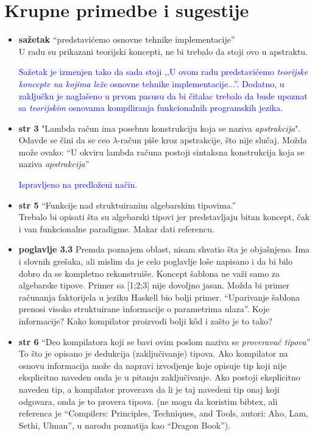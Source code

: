 \documentclass[a4paper]{report}
\newcommand{\odgovor}[1]{\textcolor{blue}{#1}}
\begin{document}
\section{Krupne primedbe i sugestije}
\begin{itemize}
\item \textbf{sažetak} ``predstavićemo osnovne tehnike implementacije'' \\ U radu su prikazani teorijski koncepti, ne bi trebalo da stoji ovo u apstraktu.

\odgovor{Sažetak je izmenjen tako da sada stoji ‚‚U ovom radu predstavićemo \textit{teorijske koncepte na kojima leže} osnovne tehnike implementacije...''. Dodatno, u zaključku je naglašeno u prvom pasusu da bi čitalac trebalo da bude upoznat sa \textit{teorijskim} osnovama kompiliranja funkcionalnih programskih jezika.}

\item \textbf{str 3} "Lambda račun ima posebnu konstrukciju koja se naziva \textit{apstrakcija}".\\Odavde se čini da se ceo $\lambda$-račun piše kroz apstrakcije, što nije slučaj. Možda može ovako: ``U okviru lambda računa postoji sintaksna konstrukcija koja se naziva \textit{apstrakcija}''

\odgovor{Ispravljeno na predloženi način.}

\item \textbf{str 5} ``Funkcije nad struktuiranim algebarskim tipovima.'' \\ Trebalo bi opisati šta su algebarski tipovi jer predstavljaju bitan koncept, čak i van funkcionalne paradigme. Makar dati referencu.

\item \textbf{poglavlje 3.3} Premda poznajem oblast, nisam shvatio šta je objašnjeno. Ima i slovnih grešaka, ali mislim da je celo poglavlje loše napisano i da bi bilo dobro da se kompletno rekonstruiše. Koncept šablona ne važi samo za algebarske tipove. Primer sa [1;2;3] nije dovoljno jasan. Možda bi primer računanja faktorijela u jeziku Haskell bio bolji primer. ``Uparivanje šablona prenosi visoko struktuirane informacije o parametrima ulaza''. Koje informacije? Kako kompilator proizvodi bolji kôd i zašto je to tako?

\item \textbf{str 6} ``Deo kompilatora koji se bavi ovim poslom naziva se \textit{proveravač tipova}'' \\ To što je opisano je dedukcija (zaključivanje) tipova. Ako kompilator na osnovu informacija može da napravi izvodjenje koje opisuje tip koji nije eksplicitno naveden onda je u pitanju zaključivanje. Ako postoji eksplicitno naveden tip, a kompilator proverava da li je taj navedeni tip onaj koji odgovara, onda je to provera tipova. (ne mogu da koristim bibtex, ali referenca je ``Compilers: Principles, Techniques, and Tools, autori: Aho, Lam, Sethi, Ulman'', u narodu poznatija kao ``Dragon Book'').


\end{itemize}
\end{document}
